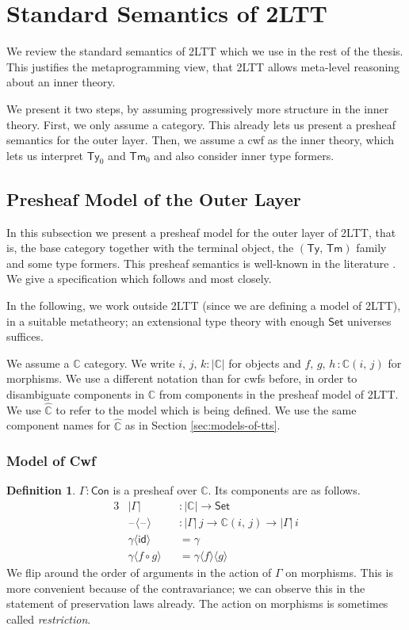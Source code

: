 \documentclass[12pt,a4paper,twoside,openany]{book}
\theoremstyle{remark}
\theoremstyle{definition}
\newtheorem{mydefinition}{Definition}
\theoremstyle{theorem}
\newcommand{\mbb}[1]{\mathbb{#1}}
\newcommand{\id}{\mathsf{id}}
\newcommand{\Con}{\mathsf{Con}}
\newcommand{\Tm}{\mathsf{Tm}}
\newcommand{\Ty}{\mathsf{Ty}}
\newcommand{\blank}{\mathord{\hspace{1pt}\text{--}\hspace{1pt}}}
\newcommand{\Set}{\mathsf{Set}}
\newcommand{\mbbC}{\mbb{C}}
\newcommand{\hmbbC}{\hat{\mbb{C}}}
\newcommand{\lab}{\langle}
\newcommand{\rab}{\rangle}
\begin{document}
\section{Standard Semantics of 2LTT}

We review the standard semantics of 2LTT which we use in the rest of the
thesis. This justifies the metaprogramming view, that 2LTT allows meta-level
reasoning about an inner theory.

We present it two steps, by assuming progressively more structure in the inner
theory. First, we only assume a category. This already lets us present a
presheaf semantics for the outer layer. Then, we assume a cwf as the inner
theory, which lets us interpret $\Ty_0$ and $\Tm_0$ and also consider inner type
formers.

\subsection{Presheaf Model of the Outer Layer}

In this subsection we present a presheaf model for the outer layer of 2LTT, that
is, the base category together with the terminal object, the $(\Ty,\,\Tm)$
family and some type formers. This presheaf semantics is well-known in the
literature \cite{TODO}. We give a specification which follows \cite{TODO} and
\cite{TODO} most closely.

In the following, we work outside 2LTT (since we are defining a model of 2LTT),
in a suitable metatheory; an extensional type theory with enough $\Set$
universes suffices.

We assume a $\mbbC$ category. We write $i,\,j,\,k : |\mbbC|$ for objects and
$f,\,g,\,h\,: \mbbC(i,\,j)$ for morphisms. We use a different notation than for
cwfs before, in order to disambiguate components in $\mbbC$ from components in
the presheaf model of 2LTT. We use $\hmbbC$ to refer to the model which is being
defined. We use the same component names for $\hmbbC$ as in Section
\ref{sec:models-of-tts}.

\subsubsection{Model of Cwf}

\begin{mydefinition}
$\Gamma : \Con$ is a presheaf over $\mbbC$. Its components
are as follows.
\begin{alignat*}{3}
  & |\Gamma|             &&: |\mbbC| \to \Set \\
  & \blank\lab\blank\rab &&: |\Gamma|\,j \to \mbbC(i,\,j) \to |\Gamma|\,i\\
  & \gamma\lab\id\rab &&= \gamma \\
  & \gamma\lab f\circ g\rab &&= \gamma \lab f \rab \lab g \rab
\end{alignat*}
We flip around the order of arguments in the action of $\Gamma$ on
morphisms. This is more convenient because of the contravariance; we can observe
this in the statement of preservation laws already. The action on morphisms is
sometimes called \emph{restriction}.
\end{mydefinition}
\end{document}
